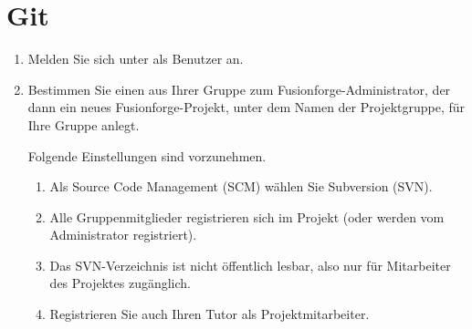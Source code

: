 \section*{Git}

\begin{enumerate}
\item Melden Sie sich unter  als Benutzer an.
\item Bestimmen Sie einen aus Ihrer Gruppe zum Fusionforge-Administrator, der dann ein neues Fusionforge-Projekt, unter dem Namen der Projektgruppe, für Ihre Gruppe anlegt.

Folgende Einstellungen sind vorzunehmen.
\begin{enumerate}[label=\alph*)]
\item Als Source Code Management (SCM) wählen Sie Subversion (SVN).
\item Alle Gruppenmitglieder registrieren sich im Projekt (oder werden vom Administrator registriert).
\item Das SVN-Verzeichnis ist nicht öffentlich lesbar, also nur für Mitarbeiter des Projektes zugänglich.
\item Registrieren Sie auch Ihren Tutor als Projektmitarbeiter.
\end{enumerate}
\end{enumerate}